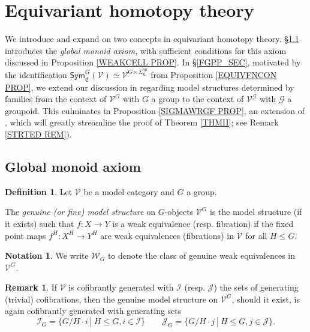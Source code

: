 \documentclass[a4paper,10pt
,draft
]{article}%
\numberwithin{equation}{section}
\numberwithin{figure}{section}
\theoremstyle{definition} %
\newtheorem{definition}[equation]{Definition}%
\newtheorem{remark}[equation]{Remark}%
\newtheorem{notation}[equation]{Notation}%
\newcommand{\V}{\ensuremath{\mathcal V}}
\newcommand{\G}{\ensuremath{\mathcal G}}
\newcommand{\1}{\ensuremath{\mathbbm 1}}%
\begin{document}
\section{Equivariant homotopy theory}
\label{EHT_SEC}


We introduce and expand on two concepts in equivariant homotopy theory.
\S \ref{GMA_SEC} introduces the \emph{global monoid axiom}, 
with sufficient conditions for this axiom discussed in 
Proposition \ref{WEAKCELL PROP}.
In \S \ref{FGPP_SEC},
motivated by the identification
$\mathsf{Sym}^{G}_{\mathfrak{C}}(\V)
\simeq \V^{G \ltimes \Sigma^{op}_{\mathfrak{C}}}$
from Proposition \ref{EQUIVFNCON PROP}, 
we extend our discussion 
in \cite[\S 6]{BP_geo}
regarding model structures determined by families
from the context of $\V^G$ with $G$ a group to the context of
$\V^{\G}$ with $\G$ a groupoid.
This culminates in Proposition \ref{SIGMAWRGF PROP}, an extension of \cite[Prop. 6.25]{BP_geo},
which will greatly streamline the proof of Theorem \ref{THMII}; see Remark \ref{STRTED REM}).


\subsection{Global monoid axiom}
\label{GMA_SEC}



\begin{definition}\label{GENMOD DEF}
	Let $\V$ be a model category and $G$ a group.
	
	The \emph{genuine (or fine) model structure} on $G$-objects $\V^G$
	is the model structure (if it exists)
	such that
	$f\colon X \to Y$
	is a weak equivalence (resp. fibration)
	if the fixed point maps
	$f^H\colon X^H \to Y^H$
	are weak equivalences (fibrations) in $\V$
	for all $H \leq G$.
\end{definition}


\begin{notation}
	We write $\mathcal{W}_G$
	to denote the class of genuine weak equivalences in $\V^G$.
\end{notation}


\begin{remark}
	If $\V$ is cofibrantly generated with 
	$\mathcal{I}$ (resp. $\mathcal{J}$)
	the sets of generating (trivial) cofibrations,
	then the genuine model structure on $\V^G$,
	should it exist,
	is again cofibrantly generated with generating sets
	\begin{equation}\label{GENGENSETEQ}
	\mathcal{I}_G = \{G/H \cdot i \ | \ H\leq G,i\in \mathcal{I}\}
	\qquad
	\mathcal{J}_G = \{G/H \cdot j \ | \ H\leq G,j\in \mathcal{J}\}.
	\end{equation}
\end{remark}
\end{document}
